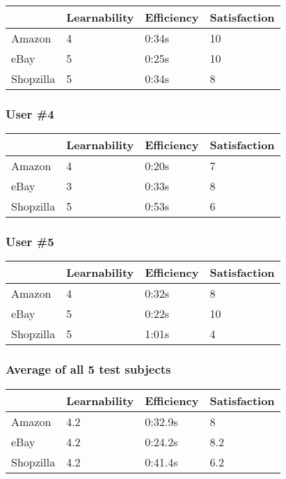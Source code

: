 \documentclass[11pt, oneside]{article}
\begin{document}
\begin{center}
\begin{tabular}{| l | l | l | l |}
    \hline
     & Learnability & Efficiency & Satisfaction \\ \hline
    Amazon & 4 & 0:34s & 10 \\ \hline
    eBay & 5 & 0:25s & 10 \\ \hline
    Shopzilla & 5 & 0:34s & 8 \\ \hline
\end{tabular}
\end{center}

\subsubsection{User \#4}

\begin{center}
\begin{tabular}{| l | l | l | l |}
    \hline
     & Learnability & Efficiency & Satisfaction \\ \hline
    Amazon & 4 & 0:20s & 7 \\ \hline
    eBay & 3 & 0:33s & 8 \\ \hline
    Shopzilla & 5 & 0:53s & 6 \\\hline
\end{tabular}
\end{center}

\subsubsection{User \#5}

\begin{center}
\begin{tabular}{| l | l | l | l |}
    \hline
     & Learnability & Efficiency & Satisfaction \\ \hline
    Amazon & 4 & 0:32s & 8 \\ \hline
    eBay & 5 & 0:22s & 10 \\ \hline
    Shopzilla & 5 & 1:01s & 4 \\\hline
\end{tabular}
\end{center}

\subsubsection{Average of all 5 test subjects}

\begin{center}
\begin{tabular}{| l | l | l | l |}
    \hline
     & Learnability & Efficiency & Satisfaction \\ \hline
    Amazon & 4.2 & 0:32.9s & 8 \\ \hline
    eBay & 4.2 & 0:24.2s & 8.2 \\ \hline
    Shopzilla & 4.2 & 0:41.4s & 6.2 \\\hline
\end{tabular}
\end{center}
\end{document}
